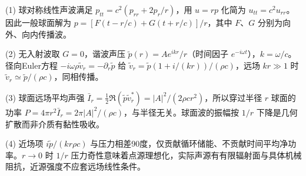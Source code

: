 (1) 球对称线性声波满足 \(p_{tt}=c^2(p_{rr}+2p_r/r)\)，用 \(u=rp\) 化简为 \(u_{tt}=c^2u_{rr}\)。因此一般球面解为 \(p=[F(t-r/c)+G(t+r/c)]/r\)，其中 \(F\)、\(G\) 分别为向外、向内传播波。

(2) 无入射波取 \(G=0\)，谐波声压 \(\tilde p(r)=A e^{ikr}/r\)（时间因子 \(e^{-i\omega t}\)），\(k=\omega/c\)。径向Euler方程 \(-i\omega\rho\tilde v_r=-\partial_r\tilde p\) 给 \(\tilde v_r=\tilde p(1+i/(kr))/(\rho c)\)，远场 \(kr\gg1\) 时 \(\tilde v_r\simeq\tilde p/(\rho c)\)，同相传播。

(3) 球面远场平均声强 \(\bar I_r=\frac12\Re(\tilde p\tilde v_r^*)=|A|^2/(2\rho c r^2)\)，所以穿过半径 \(r\) 球面的功率 \(\boxed{P=4\pi r^2\bar I_r=2\pi|A|^2/(\rho c)}\)，与半径无关。球面波的振幅按 \(1/r\) 下降是几何扩散而非介质有黏性吸收。

(4) 近场项 \(i\tilde p/(kr\rho c)\) 与压力相差90度，仅贡献循环储能、不贡献时间平均净功率。\(r\to0\) 时 \(1/r\) 压力奇性意味着点源理想化，实际声源有有限辐射面与具体机械阻抗，近源强度不应套远场线性条件。
